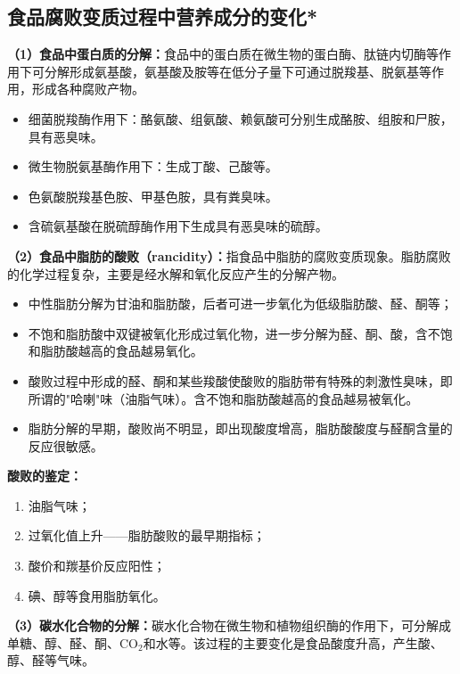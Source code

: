 \subsection{食品腐败变质过程中营养成分的变化*}

\begin{keybox}
\textbf{（1）食品中蛋白质的分解：}食品中的蛋白质在微生物的蛋白酶、肽链内切酶等作用下可分解形成氨基酸，氨基酸及胺等在低分子量下可通过脱羧基、脱氨基等作用，形成各种腐败产物。
\begin{itemize}[leftmargin=*]
    \item 细菌脱羧酶作用下：酪氨酸、组氨酸、赖氨酸可分别生成酪胺、组胺和尸胺，具有恶臭味。
    \item 微生物脱氨基酶作用下：生成丁酸、己酸等。
    \item 色氨酸脱羧基色胺、甲基色胺，具有粪臭味。
    \item 含硫氨基酸在脱硫醇酶作用下生成具有恶臭味的硫醇。
\end{itemize}

\textbf{（2）食品中脂肪的酸败（rancidity）：}指食品中脂肪的腐败变质现象。脂肪腐败的化学过程复杂，主要是经水解和氧化反应产生的分解产物。
\begin{itemize}[leftmargin=*]
    \item 中性脂肪分解为甘油和脂肪酸，后者可进一步氧化为低级脂肪酸、醛、酮等；
    \item 不饱和脂肪酸中双键被氧化形成过氧化物，进一步分解为醛、酮、酸，含不饱和脂肪酸越高的食品越易氧化。
    \item 酸败过程中形成的醛、酮和某些羧酸使酸败的脂肪带有特殊的刺激性臭味，即所谓的"哈喇"味（油脂气味）。含不饱和脂肪酸越高的食品越易被氧化。
    \item 脂肪分解的早期，酸败尚不明显，即出现酸度增高，脂肪酸酸度与醛酮含量的反应很敏感。
\end{itemize}

\textbf{酸败的鉴定：}
\begin{enumerate}[leftmargin=*]
    \item 油脂气味；
    \item 过氧化值上升——脂肪酸败的最早期指标；
    \item 酸价和羰基价反应阳性；
    \item 碘、醇等食用脂肪氧化。
\end{enumerate}

\textbf{（3）碳水化合物的分解：}碳水化合物在微生物和植物组织酶的作用下，可分解成单糖、醇、醛、酮、CO$_2$和水等。该过程的主要变化是食品酸度升高，产生酸、醇、醛等气味。
\end{keybox}

